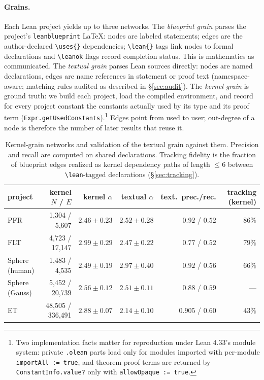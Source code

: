 \documentclass[11pt]{article}
\begin{document}
\paragraph{Grains.} Each Lean project yields up to three networks. The \emph{blueprint grain}
parses the project's \texttt{leanblueprint} LaTeX: nodes are labeled statements; edges are the
author-declared \verb|\uses{}| dependencies; \verb|\lean{}| tags link nodes to formal
declarations and \verb|\leanok| flags record completion status. This is mathematics as
communicated. The \emph{textual grain} parses Lean sources directly: nodes are named
declarations, edges are name references in statement or proof text (namespace-aware; matching
rules audited as described in \S\ref{sec:audit}). The \emph{kernel grain} is ground truth: we
build each project, load the compiled environment, and record for every project constant the
constants actually used by its type and its proof term
(\texttt{Expr.getUsedConstants}).\footnote{Two implementation facts matter for reproduction
under Lean 4.33's module system: private \texttt{.olean} parts load only for modules imported
with per-module \texttt{importAll := true}, and theorem proof terms are returned by
\texttt{ConstantInfo.value?} only with \texttt{allowOpaque := true}.} Edges point from used to
user; out-degree of a node is therefore the number of later results that reuse it.

\begin{table}[t]
\centering
\small
\begin{tabular}{lrrrrr}
\toprule
project & kernel $N$ / $E$ & kernel $\alpha$ & textual $\alpha$ & text.\ prec./rec. & tracking (kernel) \\
\midrule
PFR & 1{,}304 / 5{,}607 & $2.46 \pm 0.23$ & $2.52 \pm 0.28$ & $0.92$ / $0.52$ & $86\%$ \\
FLT & 4{,}723 / 17{,}147 & $2.99 \pm 0.29$ & $2.47 \pm 0.22$ & $0.77$ / $0.52$ & $79\%$ \\
Sphere (human) & 1{,}483 / 4{,}535 & $2.49 \pm 0.19$ & $2.97 \pm 0.40$ & $0.92$ / $0.56$ & $66\%$ \\
Sphere (Gauss) & 5{,}452 / 20{,}739 & $2.56 \pm 0.12$ & $2.51 \pm 0.11$ & $0.88$ / $0.59$ & --- \\
ET & 48{,}505 / 336{,}491 & $2.88 \pm 0.07$ & $2.14 \pm 0.10$ & $0.905$ / $0.60$ & $43\%$ \\
\bottomrule
\end{tabular}
\caption{Kernel-grain networks and validation of the textual grain against them. Precision and
recall are computed on shared declarations. Tracking fidelity is the fraction of blueprint edges
realized as kernel dependency paths of length $\le 6$ between \texttt{\textbackslash lean}-tagged
declarations (\S\ref{sec:tracking}).}
\label{tab:kernel}
\end{table}
\end{document}
